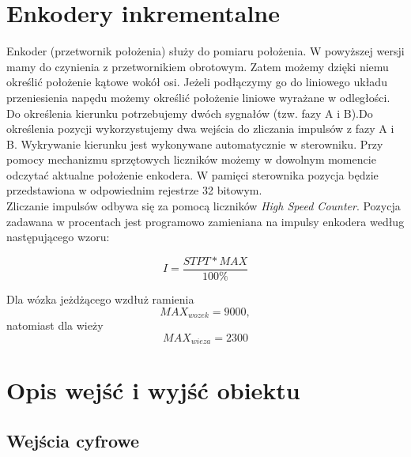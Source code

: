 \documentclass{mwrep}
\begin{document}
\section{Enkodery inkrementalne}
\label{Opis::Enkodery}
Enkoder (przetwornik położenia) służy do pomiaru położenia. W powyższej wersji
mamy do czynienia z przetwornikiem obrotowym. Zatem możemy dzięki niemu określić
położenie kątowe wokół osi. Jeżeli podłączymy go do liniowego układu przeniesienia napędu
możemy określić położenie liniowe wyrażane w odległości.\\
\indent Do określenia kierunku potrzebujemy dwóch sygnałów (tzw.
fazy A i B).Do określenia pozycji wykorzystujemy dwa wejścia do zliczania 
impulsów z fazy A i B. Wykrywanie kierunku jest wykonywane
automatycznie w sterowniku. Przy pomocy mechanizmu sprzętowych liczników możemy w
dowolnym momencie odczytać aktualne położenie enkodera. W pamięci
sterownika pozycja będzie przedstawiona w odpowiednim rejestrze 32 bitowym.\\
\indent Zliczanie impulsów odbywa się za pomocą liczników \emph{High Speed Counter}.
Pozycja zadawana w procentach jest programowo zamieniana na impulsy enkodera 
według następującego wzoru:

$$ I = \frac{STPT * MAX}{100\%}$$

Dla wózka jeżdżącego wzdłuż ramienia $$MAX_{wozek} = 9000,$$
natomiast dla wieży $$MAX_{wieza} = 2300$$

\section{Opis wejść i wyjść obiektu}
\label{Opis::IO}

\subsection{Wejścia cyfrowe}
\label{Opis::IO::Input}
\end{document}
